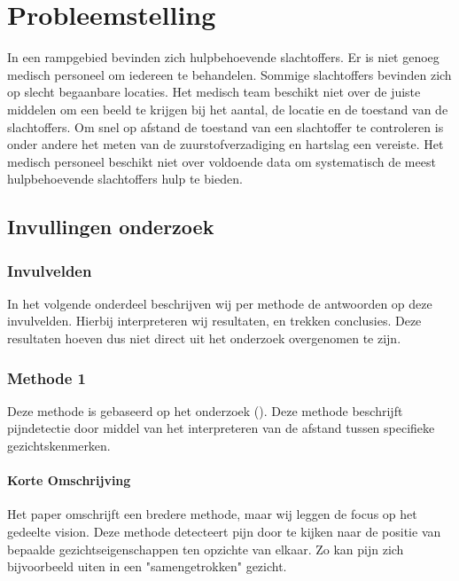 \documentclass[11pt]{article}
\begin{document}
    \section{Probleemstelling}\label{sec:probleemstelling}
    In een rampgebied bevinden zich hulpbehoevende slachtoffers. 
    Er is niet genoeg medisch personeel om iedereen te behandelen. 
    Sommige slachtoffers bevinden zich op slecht begaanbare locaties. 
    Het medisch team beschikt niet over de juiste middelen om een beeld te krijgen bij het aantal, de locatie en de toestand van de slachtoffers. 
    Om snel op afstand de toestand van een slachtoffer te controleren is onder andere het meten van de zuurstofverzadiging en hartslag een vereiste. 
    Het medisch personeel beschikt niet over voldoende data om systematisch de meest hulpbehoevende slachtoffers hulp te bieden.



    \subsection{Invullingen onderzoek}\label{subsec:invullingen-onderzoek}
    \subsubsection{Invulvelden}
    In het volgende onderdeel beschrijven wij per methode de antwoorden op deze invulvelden.
    Hierbij interpreteren wij resultaten, en trekken conclusies.
    Deze resultaten hoeven dus niet direct uit het onderzoek overgenomen te zijn.

    \subsubsection{Methode 1}
    Deze methode is gebaseerd op het onderzoek (\citet{werner2014automatic}).
    Deze methode beschrijft pijndetectie door middel van het interpreteren van de afstand tussen specifieke gezichtskenmerken.

    \paragraph{Korte Omschrijving}
    Het paper omschrijft een bredere methode, maar wij leggen de focus op het gedeelte vision.
    Deze methode detecteert pijn door te kijken naar de positie van bepaalde gezichtseigenschappen ten opzichte van elkaar.
    Zo kan pijn zich bijvoorbeeld uiten in een "samengetrokken" gezicht.
\end{document}
